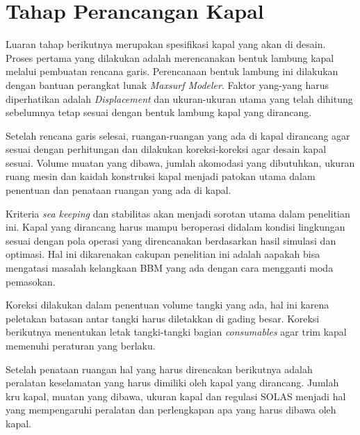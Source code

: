 \section{Tahap Perancangan Kapal}
\label{sec:tahap-deskap}

Luaran tahap berikutnya merupakan spesifikasi kapal yang akan di desain. Proses pertama yang dilakukan adalah merencanakan bentuk lambung kapal melalui pembuatan rencana garis. Perencanaan bentuk lambung ini dilakukan dengan bantuan perangkat lunak \emph{Maxsurf Modeler}. Faktor yang-yang harus diperhatikan adalah \emph{Displacement} dan ukuran-ukuran utama yang telah dihitung sebelumnya tetap sesuai dengan bentuk lambung kapal yang dirancang.

Setelah rencana garis selesai, ruangan-ruangan yang ada di kapal dirancang agar sesuai dengan perhitungan dan dilakukan koreksi-koreksi agar desain kapal sesuai. Volume muatan yang dibawa, jumlah akomodasi yang dibutuhkan, ukuran ruang mesin dan kaidah konstruksi kapal menjadi patokan utama dalam penentuan dan penataan ruangan yang ada di kapal.

Kriteria \emph{sea keeping} dan stabilitas akan menjadi sorotan utama dalam penelitian ini. Kapal yang dirancang harus mampu beroperasi didalam kondisi lingkungan sesuai dengan pola operasi yang direncanakan berdasarkan hasil simulasi dan optimasi. Hal ini dikarenakan cakupan penelitian ini adalah aapakah bisa mengatasi masalah kelangkaan BBM yang ada dengan cara mengganti moda pemasokan.

Koreksi dilakukan dalam penentuan volume tangki yang ada, hal ini karena peletakan batasan antar tangki harus diletakkan di gading besar. Koreksi berikutnya menentukan letak tangki-tangki bagian \emph{consumables} agar trim kapal memenuhi peraturan yang berlaku.

Setelah penataan ruangan hal yang harus direncakan berikutnya adalah peralatan keselamatan yang harus dimiliki oleh kapal yang dirancang. Jumlah kru kapal, muatan yang dibawa, ukuran kapal dan regulasi SOLAS menjadi hal yang mempengaruhi peralatan dan perlengkapan apa yang harus dibawa oleh kapal.
